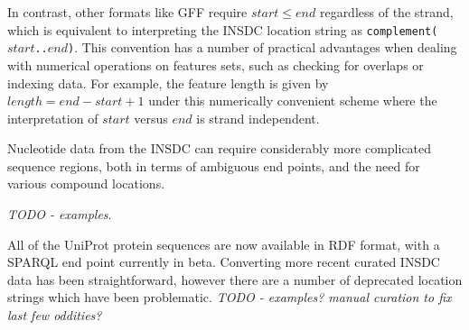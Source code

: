 In contrast, other formats like GFF require $start \leq end$
regardless of the strand, which is equivalent to interpreting
the INSDC location string as \texttt{complement($start$..$end$)}.
This convention has a number of practical advantages when
dealing with numerical operations on features sets, such as
checking for overlaps or indexing data. For example, the
feature length is given by $length = end - start + 1$ under
this numerically convenient scheme where the interpretation
of $start$ versus $end$ is strand independent.

Nucleotide data from the INSDC can require considerably more complicated
sequence regions, both in terms of ambiguous end points, and the need for
various compound locations.

\textit{TODO - examples}.

All of the UniProt protein sequences are now available in RDF format,
with a SPARQL end point currently in beta. Converting more recent
curated INSDC data has been straightforward, however there are a
number of deprecated location strings which have been problematic.
\textit{TODO - examples? manual curation to fix last few oddities?}
